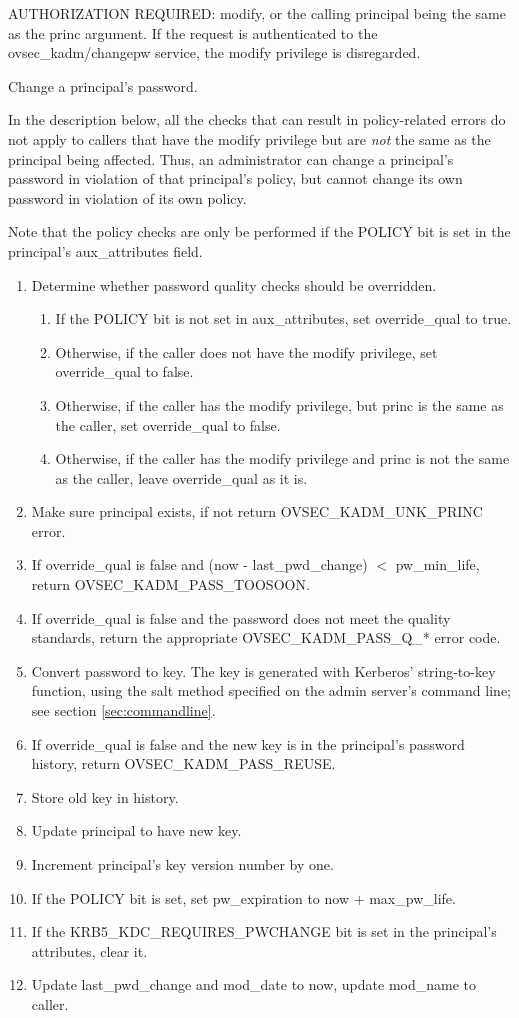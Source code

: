 AUTHORIZATION REQUIRED: modify, or the calling principal being the
same as the princ argument.  If the request is authenticated to the
ovsec_kadm/changepw service, the modify privilege is disregarded.

Change a principal's password.  

In the description below, all the checks that can result in
policy-related errors do not apply to callers that have the modify
privilege but are {\it not} the same as the principal being affected.
Thus, an administrator can change a principal's password in violation
of that principal's policy, but cannot change its own password in
violation of its own policy.

Note that the policy checks are only be performed if the POLICY bit is
set in the principal's aux_attributes field.

\begin{enumerate}
\item Determine whether password quality checks should be overridden.
\begin{enumerate}
\item If the POLICY bit is not set in aux_attributes, set
override_qual to true.
\item Otherwise, if the caller does not have the modify privilege,
set override_qual to false.
\item Otherwise, if the caller has the modify privilege, but princ is the
same as the caller, set override_qual to false.
\item Otherwise, if the caller has the modify privilege and princ is
not the same as the caller, leave override_qual as it is.
\end{enumerate}
\item Make sure principal exists, if not return OVSEC_KADM_UNK_PRINC error.
\item If override_qual is false and (now - last_pwd_change) $<$
pw_min_life, return OVSEC_KADM_PASS_TOOSOON.
\item If override_qual is false and the password does not meet the quality
standards, return the appropriate OVSEC_KADM_PASS_Q_* error code.
\item Convert password to key.  The key is generated with
Kerberos' string-to-key function, using the salt method specified on
the admin server's command line; see section \ref{sec:commandline}.
\item If override_qual is false and the new key is in the principal's
password history, return OVSEC_KADM_PASS_REUSE.
\item Store old key in history.
\item Update principal to have new key.
\item Increment principal's key version number by one.
\item If the POLICY bit is set, set pw_expiration to now + max_pw_life.
\item If the KRB5_KDC_REQUIRES_PWCHANGE bit is set in the principal's
attributes, clear it.
\item Update last_pwd_change and mod_date to now, update mod_name to
caller.
\end{enumerate}

